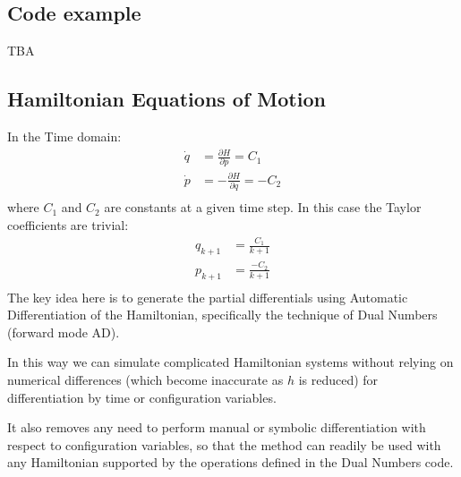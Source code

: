 \documentclass[11pt]{article}
\begin{document}
\subsection{Code example}
TBA
\subsection{Hamiltonian Equations of Motion}
In the Time domain:
\begin{equation}
\begin{aligned}
\dot{q} &= \frac {\partial H} {\partial p} = C_1 \\
\dot{p} &= - \frac {\partial H} {\partial q} = - C_2 \\
\end{aligned}
\end{equation}
where $C_1$ and $C_2$ are constants at a given time step.
In this case the Taylor coefficients are trivial:
\begin{equation}
\begin{aligned}
q_{k+1} &= \frac {C_1} {k + 1} \\
p_{k+1} &= \frac {- C_2} {k + 1} \\
\end{aligned}
\end{equation}
The key idea here is to generate the partial differentials using Automatic Differentiation of the Hamiltonian, specifically the technique of Dual Numbers (forward mode AD).

In this way we can simulate complicated Hamiltonian systems without relying on numerical differences (which become inaccurate as $h$ is reduced) for differentiation by time or configuration variables.

It also removes any need to perform manual or symbolic differentiation with respect to configuration variables, so that the method can readily be used with any Hamiltonian supported by the operations defined in the Dual Numbers code.
\end{document}
